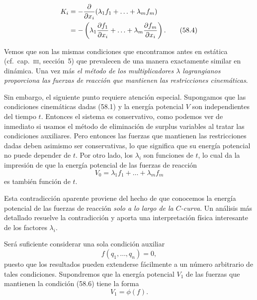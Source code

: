 \documentclass[12pt,a4paper]{book}
\begin{document}

\begin{align}
K_i &= -\frac{\partial}{\partial x_i}(\lambda_1 f_1 + \ldots + \lambda_m f_m) \notag \\
&= -\left(\lambda_1 \frac{\partial f_1}{\partial x_i} + \ldots + \lambda_m \frac{\partial f_m}{\partial x_i}\right). \tag{58.4}
\end{align}

Vemos que son las mismas condiciones que encontramos antes en estática (cf.\ cap.~\textsc{iii}, sección~5) que prevalecen de una manera exactamente similar en dinámica. Una vez más \textit{el método de los multiplicadores $\lambda$ lagrangianos proporciona las fuerzas de reacción que mantienen las restricciones cinemáticas}.

Sin embargo, el siguiente punto requiere atención especial. Supongamos que las condiciones cinemáticas dadas (58.1) y la energía potencial $V$ son independientes del tiempo $t$. Entonces el sistema es conservativo, como podemos ver de inmediato si usamos el método de eliminación de surplus variables al tratar las condiciones auxiliares. Pero entonces las fuerzas que mantienen las restricciones dadas deben asimismo ser conservativas, lo que significa que su energía potencial no puede depender de $t$. Por otro lado, los $\lambda_i$ son funciones de $t$, lo cual da la impresión de que la energía potencial de las fuerzas de reacción
\begin{equation}
V_0 = \lambda_1 f_1 + \ldots + \lambda_m f_m \tag{58.5}
\end{equation}
es también función de $t$.

Esta contradicción aparente proviene del hecho de que conocemos la energía potencial de las fuerzas de reacción \textit{solo a lo largo de la $C$-curva}. Un análisis más detallado resuelve la contradicción y aporta una interpretación física interesante de los factores $\lambda_i$.

Será suficiente considerar una sola condición auxiliar
\begin{equation}
f(q_1, \ldots, q_n) = 0, \tag{58.6}
\end{equation}
puesto que los resultados pueden extenderse fácilmente a un número arbitrario de tales condiciones. Supondremos que la energía potencial $V_1$ de las fuerzas que mantienen la condición (58.6) tiene la forma
\begin{equation}
V_1 = \phi(f). \tag{58.7}
\end{equation}
\end{document}
